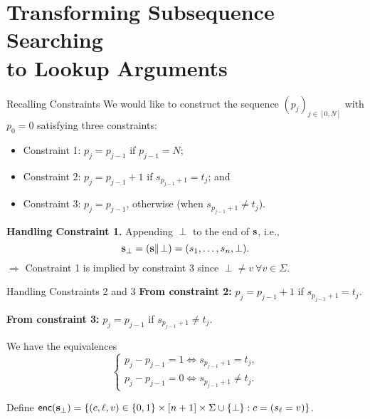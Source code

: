 \section{Transforming Subsequence Searching\\ to Lookup Arguments}
\begin{frame}{Recalling Constraints}
	We would like to construct the sequence $(p_j)_{j \in [0, N]}$ with $p_0 = 0$ satisfying three constraints:
	\begin{itemize}
		\item Constraint 1: $p_j = p_{j - 1}$ if $p_{j - 1} = N$;\\
		\item Constraint 2: $p_j = p_{j - 1} + 1$ if $s_{p_{j - 1} + 1} = t_j$; and\\
		\item Constraint 3: $p_j = p_{j - 1}$, otherwise (when $s_{p_{j - 1} + 1} \not= t_j$).
	\end{itemize}
	
	\textbf{Handling Constraint 1.} Appending $\perp$ to the end of $\mathbf{s}$, i.e.,
	\begin{equation*}
		\mathbf{s}_\perp = (\mathbf{s}\Vert\!\perp) = (s_1, \dots, s_n, \perp).
	\end{equation*}
	$\Rightarrow$ Constraint 1 is implied by constraint 3 since $\perp \not= v~\forall v \in \Sigma$.
\end{frame}
\begin{frame}{Handling Constraints 2 and 3}
	\textbf{From constraint 2:} $p_j = p_{j - 1} + 1$ if $s_{p_{j - 1} + 1} = t_j$.
	
	\textbf{From constraint 3:} $p_j = p_{j - 1}$ if $s_{p_{j - 1} + 1} \not= t_j$.
	
	We have the equivalences
	\begin{equation}\label{equation:system-of-equivalences-for-constraints-2-and-3}
		\begin{cases}
			p_j - p_{j - 1} = 1 \iff s_{p_{j - 1} + 1} = t_j,\\ 
			p_j - p_{j - 1} = 0 \iff s_{p_{j - 1} + 1} \not= t_j.
		\end{cases}
	\end{equation}
	
	Define $\mathsf{enc}(\mathbf{s}_\perp)  = \{(c, \ell, v) \in \{0,1\}\times[n+1]\times\Sigma\cup\{\perp\} : c = (s_\ell = v)\}$.
	
\end{frame}